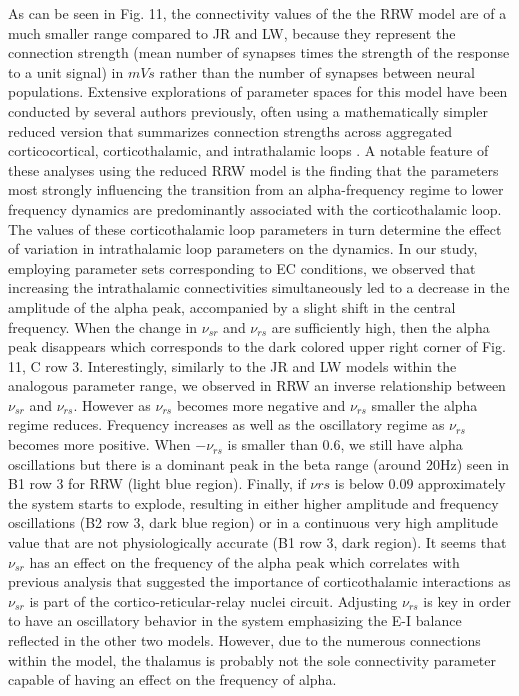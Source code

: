 \documentclass[12pt,twoside]{article}
\begin{document}
As can be seen in Fig. 11, the connectivity values of the the RRW model are of a much smaller range compared to JR and LW, because they represent the connection strength (mean number of synapses times the strength of the response to a unit signal) in $mVs$ rather than the number of synapses between neural populations. Extensive explorations of parameter spaces for this model have been conducted by several authors previously, often using a mathematically simpler reduced version that summarizes connection strengths across aggregated corticocortical, corticothalamic, and intrathalamic loops \citep{roberts2012corticothalamic, abeysuriya2015physiologically}. A notable feature of these analyses using the reduced RRW model is the finding that the parameters most strongly influencing the transition from an alpha-frequency regime to lower frequency dynamics are predominantly associated with the corticothalamic loop. The values of these corticothalamic loop parameters in turn determine the effect of variation in intrathalamic loop parameters on the dynamics. In our study, employing parameter sets corresponding to EC conditions, we observed that increasing the intrathalamic connectivities simultaneously led to a decrease in the amplitude of the alpha peak, accompanied by a slight shift in the central frequency. When the change in $\nu_{sr}$ and $\nu_{rs}$ are sufficiently high, then the alpha peak disappears which corresponds to the dark colored upper right corner of Fig. 11, C row 3. Interestingly, similarly to the JR and LW models within the analogous parameter range, we observed in RRW an inverse relationship between $\nu_{sr}$ and $\nu_{rs}$. However as $\nu_{rs}$ becomes more negative and $\nu_{rs}$ smaller the alpha regime reduces. Frequency increases as well as the oscillatory regime as $\nu_{rs}$ becomes more positive. When $-\nu_{rs}$ is smaller than 0.6, we still have alpha oscillations but there is a dominant peak in the beta range (around 20Hz) seen in B1 row 3 for RRW (light blue region). Finally, if $\nu{rs}$ is below 0.09 approximately the system starts to explode, resulting in either higher amplitude and frequency oscillations (B2 row 3, dark blue region) or in a continuous very high amplitude value that are not physiologically accurate (B1 row 3, dark region). It seems that $\nu_{sr}$ has an effect on the frequency of the alpha peak which correlates with previous analysis that suggested the importance of corticothalamic interactions as $\nu_{sr}$ is part of the cortico-reticular-relay nuclei circuit. Adjusting $\nu_{rs}$ is key in order to have an oscillatory behavior in the system emphasizing the E-I balance reflected in the other two models. However, due to the numerous connections within the model, the thalamus is probably not the sole connectivity parameter capable of having an effect on the frequency of alpha. 
\end{document}
